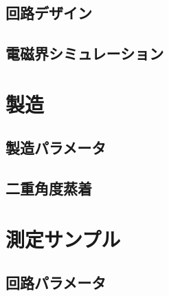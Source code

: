     \subsection{回路デザイン}

    \subsection{電磁界シミュレーション}
    

\section{製造}

    \subsection{製造パラメータ}

    \subsection{二重角度蒸着}

\section{測定サンプル}

    \subsection{回路パラメータ}
